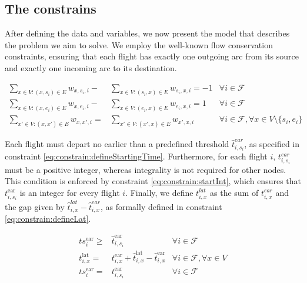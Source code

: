 \documentclass[../../thesis.tex]{subfiles}
\begin{document}
\subsection{The constrains}\label{ssec:bigModel:constrains}

After defining the data and variables, we now present the model that describes the problem we aim to solve.
We employ the well-known flow conservation constraints, ensuring that each flight has exactly one outgoing arc from its source and exactly one incoming arc to its destination.

\begin{align}
    \sum_{x\in V:(x,s_i)\in E} w_{x,s_i,i} -& \sum_{x\in V:(s_i,x)\in E} w_{s_i,x,i} = -1 & \forall i \in \mathcal{F} \\
    \sum_{x\in V:(x,e_i)\in E} w_{x,e_{i},i} -& \sum_{x\in V:(e_i,x)\in E} w_{e_{i},x,i} = 1 & \forall i \in \mathcal{F} \\
    \sum_{x'\in V:(x,x')\in E} w_{x,x',i} =& \sum_{x'\in V:(x',x)\in E} w_{x',x,i} & \forall i \in \mathcal{F}, \forall x \in V\setminus\{s_{i}, e_{i}\}
\end{align}

Each flight must depart no earlier than a predefined threshold \( \hat{t}^{ear}_{i,s_i} \), as specified in constraint \eqref{eq:constrain:defineStartingTime}.  
Furthermore, for each flight \( i \), \( t^{ear}_{i,s_i} \) must be a positive integer, whereas integrality is not required for other nodes.  
This condition is enforced by constraint \eqref{eq:constrain:startInt}, which ensures that \( t^\text{ear}_{i,s_i} \) is an integer for every flight \( i \).  
Finally, we define \( t^{lat}_{i,x} \) as the sum of \( t^{ear}_{i,x} \) and the gap given by \( \hat{t}^{lat}_{i,x} - \hat{t}^{ear}_{i,x} \), as formally defined in constraint \eqref{eq:constrain:defineLat}.

\begin{align}
    ts^\text{ear}_{i}\geq&\hat t^\text{ear}_{i,s_i}& \forall i \in \mathcal{F} \label{eq:constrain:defineStartingTime}\\
    t^\text{lat}_{i,x} =& t^\text{ear}_{i,x} + \hat t^\text{lat}_{i,x} - \hat t^\text{ear}_{i,x} & \forall i \in \mathcal{F}, \forall x \in V \label{eq:constrain:defineLat} \\
    ts^\text{ear}_{i} =& t^\text{ear}_{i,s_i} & \forall i \in \mathcal{F}\label{eq:constrain:startInt}
\end{align}
\end{document}
